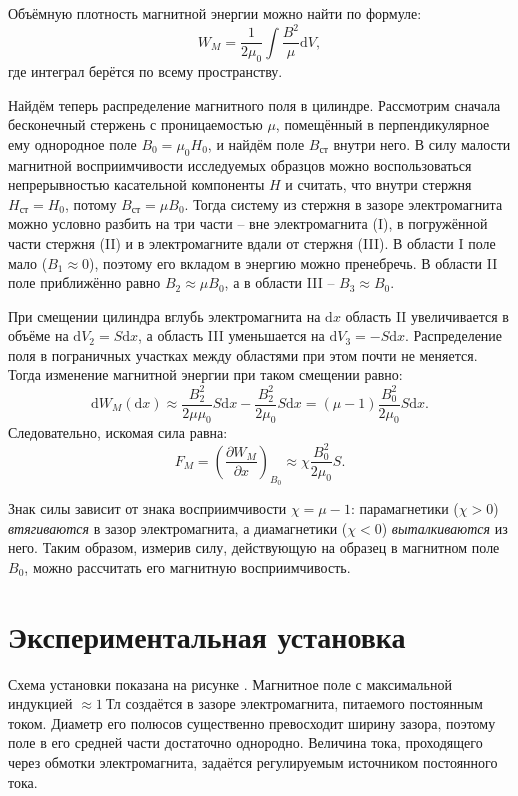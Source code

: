 \documentclass[a4paper,12pt]{article}
\begin{document}
Объёмную плотность магнитной энергии можно найти по формуле:\[W_M=\frac{1}{2\mu_0}\int\frac{B^2}{\mu}\text{d}V,\]где интеграл берётся по всему пространству.

Найдём теперь распределение магнитного поля в цилиндре. Рассмотрим сначала бесконечный стержень с проницаемостью $\mu$, помещённый в перпендикулярное ему однородное поле $B_0=\mu_0H_0$, и найдём поле $B_{\text{ст}}$ внутри него. В силу малости магнитной восприимчивости исследуемых образцов можно воспользоваться непрерывностью касательной компоненты $H$ и считать, что внутри стержня $H_{\text{ст}}=H_0$, потому $B_{\text{ст}}=\mu B_0$. Тогда систему из стержня в зазоре электромагнита можно условно разбить на три части -- вне электромагнита (I), в погружённой части стержня (II) и в электромагните вдали от стержня (III). В области I поле мало ($B_1\approx0$), поэтому его вкладом в энергию можно пренебречь. В области II поле приближённо равно $B_2\approx\mu B_0$, а в области III -- $B_3\approx B_0$.

При смещении цилиндра вглубь электромагнита на $\text{d}x$ область II увеличивается в объёме на $\text{d}V_2=S\text{d}x$, а область III уменьшается на $\text{d}V_3=-S\text{d}x$. Распределение поля в пограничных участках между областями при этом почти не меняется. Тогда изменение магнитной энергии при таком смещении равно:\[\text{d}W_M(\text{d}x)\approx\frac{B_2^2}{2\mu\mu_0}S\text{d}x-\frac{B_2^2}{2\mu_0}S\text{d}x=\left(\mu-1\right)\frac{B_0^2}{2\mu_0}S\text{d}x.\]Следовательно, искомая сила равна:\[F_M=\left(\frac{\partial W_M}{\partial x}\right)_{B_0}\approx\chi\frac{B_0^2}{2\mu_0}S.\]

Знак силы зависит от знака восприимчивости $\chi=\mu-1$: парамагнетики ($\chi > 0$) \textit{втягиваются} в зазор электромагнита, а диамагнетики ($\chi < 0$) \textit{выталкиваются} из него. Таким образом, измерив силу, действующую на образец в магнитном поле $B_0$, можно рассчитать его магнитную восприимчивость.

\section*{Экспериментальная установка}

Схема установки показана на рисунке . Магнитное поле с максимальной индукцией $\approx1~\text{Тл}$ создаётся в зазоре электромагнита, питаемого постоянным током. Диаметр его полюсов существенно превосходит ширину зазора, поэтому поле в его средней части достаточно однородно. Величина тока, проходящего через обмотки электромагнита, задаётся регулируемым источником постоянного тока.
\end{document}
